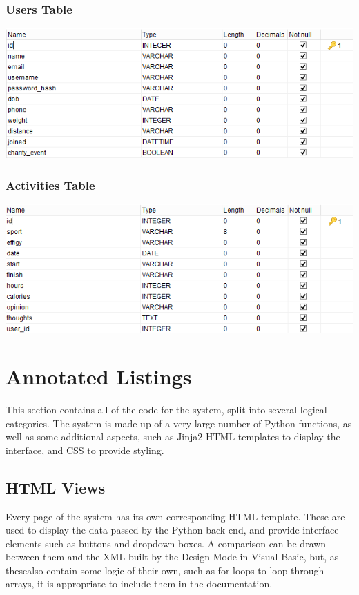 \documentclass{article}[12pt,a4paper]
\begin{document}
\subsubsection{Users Table}
\includegraphics[scale=0.65]{images/database/users_schema}

\subsubsection{Activities Table}
\includegraphics[scale=0.65]{images/database/activities_schema}

\section{Annotated Listings}
This section contains all of the code for the system, split into several logical categories. The system is made up of a very large number of Python functions, as well as some additional aspects, such as Jinja2 HTML templates to display the interface, and CSS to provide styling.

\subsection{HTML Views}
Every page of the system has its own corresponding HTML template. These are used to display the data passed by the Python back-end, and provide interface elements such as buttons and dropdown boxes. A comparison can be drawn between them and the XML built by the Design Mode in Visual Basic, but, as thesealso contain some logic of their own, such as for-loops to loop through arrays, it is appropriate to include them in the documentation.
\end{document}
